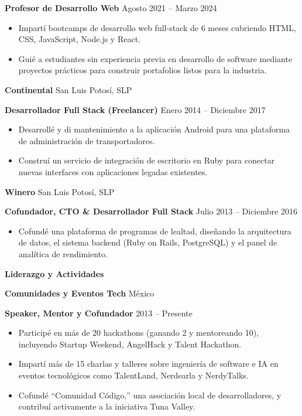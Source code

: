 \documentclass[11pt]{article}
\begin{document}
\textbf{Profesor de Desarrollo Web} \hfill Agosto 2021 -- Marzo 2024
\begin{itemize}[noitemsep, topsep=0pt, partopsep=0pt, parsep=0pt]
    \item Impartí bootcamps de desarrollo web full-stack de 6 meses cubriendo HTML, CSS, JavaScript, Node.js y React.
    \item Guié a estudiantes sin experiencia previa en desarrollo de software mediante proyectos prácticos para construir portafolios listos para la industria.
\end{itemize}

\vspace{8pt}

\textbf{Continental} \hfill San Luis Potosí, SLP

\textbf{Desarrollador Full Stack (Freelancer)} \hfill Enero 2014 -- Diciembre 2017
\begin{itemize}[noitemsep, topsep=0pt, partopsep=0pt, parsep=0pt]
    \item Desarrollé y di mantenimiento a la aplicación Android para una plataforma de administración de transportadores.
    \item Construí un servicio de integración de escritorio en Ruby para conectar nuevas interfaces con aplicaciones legadas existentes.
\end{itemize}

\vspace{8pt}

\textbf{Winero} \hfill San Luis Potosí, SLP

\textbf{Cofundador, CTO \& Desarrollador Full Stack} \hfill Julio 2013 -- Diciembre 2016
\begin{itemize}[noitemsep, topsep=0pt, partopsep=0pt, parsep=0pt]
    \item Cofundé una plataforma de programas de lealtad, diseñando la arquitectura de datos, el sistema backend (Ruby on Rails, PostgreSQL) y el panel de analítica de rendimiento.
\end{itemize}

\vspace{12pt}

\begin{center}
    \textbf{Liderazgo y Actividades}
\end{center}

\textbf{Comunidades y Eventos Tech} \hfill México

\textbf{Speaker, Mentor y Cofundador} \hfill 2013 -- Presente
\begin{itemize}[noitemsep, topsep=0pt, partopsep=0pt, parsep=0pt]
    \item Participé en más de 20 hackathons (ganando 2 y mentoreando 10), incluyendo Startup Weekend, AngelHack y Talent Hackathon.
    \item Impartí más de 15 charlas y talleres sobre ingeniería de software e IA en eventos tecnológicos como TalentLand, Nerdearla y NerdyTalks.
    \item Cofundé ``Comunidad Código,'' una asociación local de desarrolladores, y contribuí activamente a la iniciativa Tuna Valley.
\end{itemize}
\end{document}
